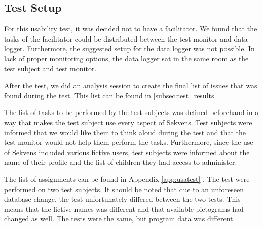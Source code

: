 \subsection{Test Setup}\label{subsec:test_setup}

For this usability test, it was decided not to have a facilitator. We found that the tasks of the facilitator could be distributed between the test monitor and data logger. Furthermore, the suggested setup for the data logger was not possible. In lack of proper monitoring options, the data logger sat in the same room as the test subject and test monitor.

After the test, we did an analysis session to create the final list of issues that was found during the test. This list can be found in \ref{subsec:test_results}.

The list of tasks to be performed by the test subjects was defined beforehand in a way that makes the test subject use every aspect of Sekvens.
Test subjects were informed that we would like them to think aloud during the test and that the test monitor would not help them perform the tasks.
Furthermore, since the use of Sekvens included various fictive users, test subjects were informed about the name of their profile and the list of children they had access to administer.

The list of assignments can be found in Appendix \ref{app:usatest} .
The test were performed on two test subjects. It should be noted that due to an unforeseen database change, the test unfortunately differed between the two tests. This means that the fictive names was different and that available pictograms had changed as well. The tests were the same, but program data was different.